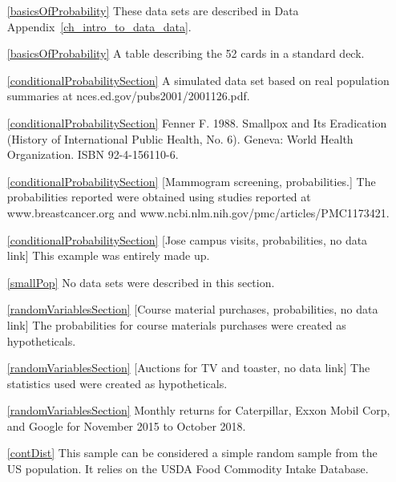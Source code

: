 \begin{itemize}
\item[\ref{basicsOfProbability}]
    These data sets are described in
    Data Appendix~\ref{ch_intro_to_data_data}.
\item[\ref{basicsOfProbability}]
    A table describing the 52 cards in a standard deck.

\item[\ref{conditionalProbabilitySection}]
    A simulated data set based on real population summaries at
        {nces.ed.gov/pubs2001/2001126.pdf}.
\item[\ref{conditionalProbabilitySection}]
    Fenner F. 1988.
    Smallpox and Its Eradication
    (History of International Public Health, No. 6).
    Geneva: World Health Organization. ISBN 92-4-156110-6.

\item[\ref{conditionalProbabilitySection}]
    [Mammogram screening, probabilities.]
    The probabilities reported were obtained using studies
    reported at
        {www.breastcancer.org}
    and 
        {www.ncbi.nlm.nih.gov/pmc/articles/PMC1173421}. 

\item[\ref{conditionalProbabilitySection}]
    [Jose campus visits, probabilities, no data link]
    This example was entirely made up.

\item[\ref{smallPop}]
    No data sets were described in this section.

\item[\ref{randomVariablesSection}]
    [Course material purchases, probabilities, no data link]
    The probabilities for course materials purchases were
    created as hypotheticals.

\item[\ref{randomVariablesSection}]
    [Auctions for TV and toaster, no data link]
    The statistics used were created as hypotheticals.

\item[\ref{randomVariablesSection}]
    Monthly returns for Caterpillar, Exxon Mobil Corp,
    and Google for November 2015 to October 2018.

\item[\ref{contDist}]
    This sample can be considered a simple random sample
    from the US population.
    It relies on the USDA Food Commodity Intake Database.

\end{itemize}





